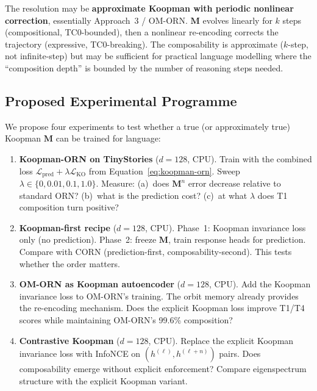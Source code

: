 \documentclass[11pt, a4paper]{article}
\newcommand{\M}{\mathbf{M}}
\theoremstyle{plain}
\theoremstyle{remark}
\begin{document}
The resolution may be \textbf{approximate Koopman with periodic nonlinear correction}, essentially Approach~3 / OM-ORN.
$\M$ evolves linearly for $k$ steps (compositional, TC0-bounded), then a nonlinear re-encoding corrects the trajectory (expressive, TC0-breaking).
The composability is approximate ($k$-step, not infinite-step) but may be sufficient for practical language modelling where the ``composition depth'' is bounded by the number of reasoning steps needed.

\subsection{Proposed Experimental Programme}

We propose four experiments to test whether a true (or approximately true) Koopman $\M$ can be trained for language:

\begin{enumerate}
    \item \textbf{Koopman-ORN on TinyStories} ($d{=}128$, CPU).
    Train with the combined loss $\mathcal{L}_{\text{pred}} + \lambda \mathcal{L}_{\text{KO}}$ from Equation~\ref{eq:koopman-orn}.
    Sweep $\lambda \in \{0, 0.01, 0.1, 1.0\}$.
    Measure: (a)~does $\M^n$ error decrease relative to standard ORN?
    (b)~what is the prediction cost?
    (c)~at what $\lambda$ does T1 composition turn positive?

    \item \textbf{Koopman-first recipe} ($d{=}128$, CPU).
    Phase~1: Koopman invariance loss only (no prediction).
    Phase~2: freeze $\M$, train response heads for prediction.
    Compare with CORN (prediction-first, composability-second).
    This tests whether the order matters.

    \item \textbf{OM-ORN as Koopman autoencoder} ($d{=}128$, CPU).
    Add the Koopman invariance loss to OM-ORN's training.
    The orbit memory already provides the re-encoding mechanism.
    Does the explicit Koopman loss improve T1/T4 scores while maintaining OM-ORN's 99.6\% composition?

    \item \textbf{Contrastive Koopman} ($d{=}128$, CPU).
    Replace the explicit Koopman invariance loss with InfoNCE on $(h^{(\ell)}, h^{(\ell+n)})$ pairs.
    Does composability emerge without explicit enforcement?
    Compare eigenspectrum structure with the explicit Koopman variant.
\end{enumerate}
\end{document}
